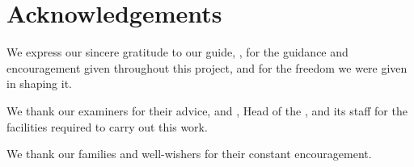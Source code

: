 \chapter*{Acknowledgements}
\thispagestyle{empty}
We express our sincere gratitude to our guide, \guidename, for the guidance and encouragement given throughout this project, and for the freedom we were given in shaping it.

We thank our examiners for their advice, and \hodname, Head of the \department, and its staff for the facilities required to carry out this work.

We thank our families and well-wishers for their constant encouragement.
